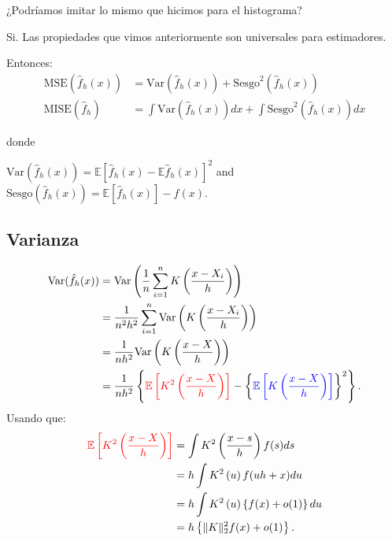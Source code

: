 \documentclass[
  12pt,
]{book}
\theoremstyle{definition}
\theoremstyle{definition}
\theoremstyle{definition}
\theoremstyle{remark}
\let\BeginKnitrBlock\begin \let\EndKnitrBlock\end
\begin{document}
\BeginKnitrBlock{remark}
{}¿Podríamos imitar lo mismo que hicimos para el histograma?
\EndKnitrBlock{remark}

Si. Las propiedades que vimos anteriormente son universales para estimadores.

Entonces:
\begin{align*}
\mathrm{MSE}(\hat{f}_{h}(x)) & =\mathrm{Var}(\hat{f}_{h}(x))+\mathrm{Sesgo}^{2} (\hat{f}_{h}(x))            \\
\mathrm{MISE}(\hat{f}_{h})   & =\int\mathrm{Var}(\hat{f}_{h}(x))dx+\int\mathrm{Sesgo}^{2}(\hat{f}_{h}(x))dx
\end{align*}

donde

\(\mathrm{Var}\left(\hat{f}_{h}(x)\right)=\mathbb{E}\left[\hat{f}_{h}(x)-\mathbb{E}\hat{f}_{h}(x)\right]^{2}\) and \(\mathrm{Sesgo}\left(\hat{f}_{h}(x)\right)=\mathbb{E}\left[\hat{f}_{h}(x)\right]-f(x)\).

\hypertarget{varianza-1}{%
\subsection{Varianza}\label{varianza-1}}

\begin{align*}
\mathrm{Var}(\hat{f}_{h}(x))
& =\mathrm{Var}\left(\frac{1}{n}\sum_{i=1}^{n}K\left(\frac{x-X_{i}}{h}\right)\right)          \\
& =\frac{1}{n^{2}h^{2}}\sum_{i=1}^{n}\mathrm{Var}\left(K\left(\frac{x-X_{i}}{h}\right)\right) \\
& =\frac{1}{nh^{2}}\mathrm{Var}\left(K\left(\frac{x-X}{h}\right)\right)                       \\
& =\frac{1}{nh^{2}}\left\{
\textcolor{red}{\mathbb{E}\left[K^{2}\left(\frac{x-X}{h}\right)\right]}
-\left\{
\textcolor{blue}{\mathbb{E}\left[K\left(\frac{x-X}{h}\right)\right]}
\right\}^{2}
\right\}.
\end{align*}
Usando que:
\begin{align*}
\textcolor{red}{\mathbb{E}\left[K^{2}\left(\frac{x-X}{h}\right)\right]}
& =\int K^{2}\left(\frac{x-s}{h}\right)f(s)ds            \\
& =h\int K^{2}\left(u\right)f(uh+x)du                    \\
& =h\int K^{2}\left(u\right)\left\{ f(x)+o(1)\right\} du \\
& =h\left\{ \Vert K\Vert_{2}^{2}f(x)+o(1)\right\} .
\end{align*}
\end{document}
